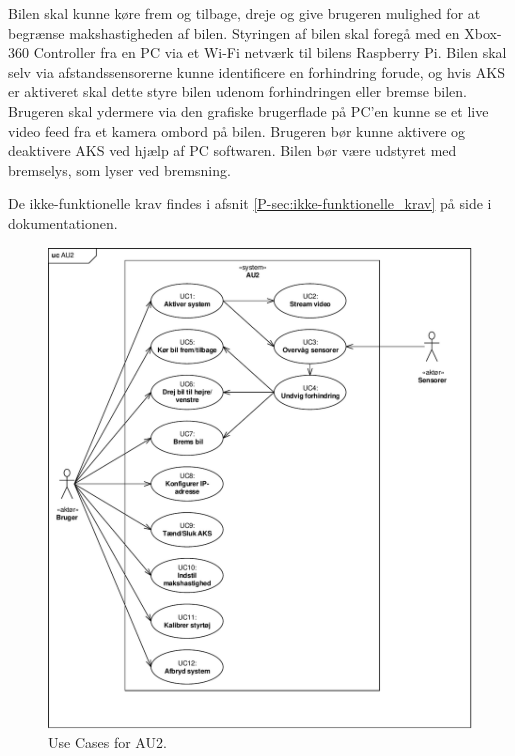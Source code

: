 Bilen skal kunne køre frem og tilbage, dreje og give brugeren mulighed for at begrænse makshastigheden af bilen. 
Styringen af bilen skal foregå med en Xbox-360 Controller fra en PC via et Wi-Fi netværk til bilens Raspberry Pi.
Bilen skal selv via afstandssensorerne kunne identificere en forhindring forude, og hvis AKS er aktiveret skal dette styre bilen udenom forhindringen eller bremse bilen.
Brugeren skal ydermere via den grafiske brugerflade på PC'en kunne se et live video feed fra et kamera ombord på bilen.
Brugeren bør kunne aktivere og deaktivere AKS ved hjælp af PC softwaren.
Bilen bør være udstyret med bremselys, som lyser ved bremsning.

De ikke-funktionelle krav findes i afsnit \ref{P-sec:ikke-funktionelle_krav}  på side \pageref{P-sec:ikke-funktionelle_krav} i dokumentationen.

\clearpage

\begin{figure}[h]
\centering
\includegraphics[width=\textwidth]{../fig/diagrammer/uc_au2}
\caption{Use Cases for AU2.}
\label{fig:use_cases}
\end{figure}